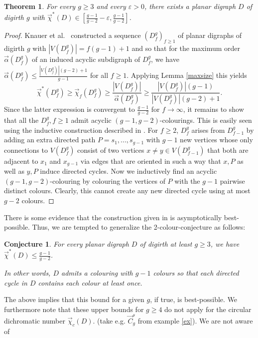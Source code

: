 \documentclass[fontsize=11pt,a4paper,DIV12]{scrartcl}
\def\n{\par\noindent}
\theoremstyle{meiner}
\newtheorem{theorem}{Theorem}
\newtheorem{conjecture}{Conjecture}
\theoremstyle{definition}
\begin{document}
\begin{theorem}
  For every $g \ge 3$ and every $\varepsilon>0$, there exists a planar
  digraph $D$ of digirth $g$ with $\vec{\chi}^\ast(D) \in
  [\frac{g-1}{g-2}-\varepsilon,\frac{g-1}{g-2}]$.
\end{theorem}
\begin{proof}
  Knauer et al.\ \cite{withoutlargeacyclic} constructed a sequence
  $(D_f^g)_{f \ge 1}$ of planar digraphs of digirth $g$ with
  $|V(D_f^g)|=f(g-1)+1$ and so that for the maximum order
  $\vec{\alpha}(D_f^g)$ of an induced acyclic subdigraph of $D_f^g$,
  we have $\vec{\alpha}(D_f^g) \leq \frac{|V(D_f^g)|(g-2)+1}{g-1}$ for
  all $f \ge 1$. Applying Lemma \ref{maxsize} this yields
  $$\vec{\chi}^\ast(D_f^g) \ge \vec{\chi}_f(D_f^g) \ge
  \frac{|V(D_f^g)|}{\vec{\alpha}(D_f^g)} \ge
  \frac{|V(D_f^g)|(g-1)}{|V(D_f^g)|(g-2)+1}.$$ Since the latter
  expression is convergent to $\frac{g-1}{g-2}$ for $f \rightarrow
  \infty$, it remains to show that all the $D_f^g, f \ge 1$ admit
  acyclic $(g-1,g-2)$-colourings.  This is easily seen using the
  inductive construction described in \cite{withoutlargeacyclic}.  For
  $f \ge 2$, $D_{f}^g$ arises from $D_{f-1}^g$ by adding an extra
  directed path $P=s_1,...,s_{g-1}$ with $g-1$ new vertices whose only
  connections to $V(D_f^g)$ consist of two vertices $x \neq y \in
  V(D_{f-1}^g)$ that both are adjacent to $x_1$ and $x_{g-1}$ via
  edges that are oriented in such a way that $x,P$ as well as $y,P$
  induce directed cycles. Now we inductively find an acyclic
  $(g-1,g-2)$-colouring by colouring the vertices of $P$ with the
  $g-1$ pairwise distinct colours. Clearly, this cannot create any new
  directed cycle using at most $g-2$ colours.
\end{proof}
There is some evidence that the construction given in
\cite{withoutlargeacyclic} is asymptotically best-possible. Thus, we
are tempted to  generalize the
2-colour-conjecture as follows:
\begin{conjecture} \label{girth} For every planar digraph $D$ of
  digirth at least $g \ge 3$, we have $\vec{\chi}^\ast(D) \leq
  \frac{g-1}{g-2}$. \n In other words, $D$ admits a colouring with
  $g-1$ colours so that each directed cycle in $D$ contains each
  colour at least once.
\end{conjecture}
The  above implies  that  this bound for a  given $g$,  if  true, is
best-possible. We furthermore note that these  upper bounds for $g \ge
4$ do not apply for the circular dichromatic number $\vec{\chi}_c(D)$.
(take e.g. $\vec{C}_g^s$ from example \ref{ex}).  We  are not aware of
\end{document}
